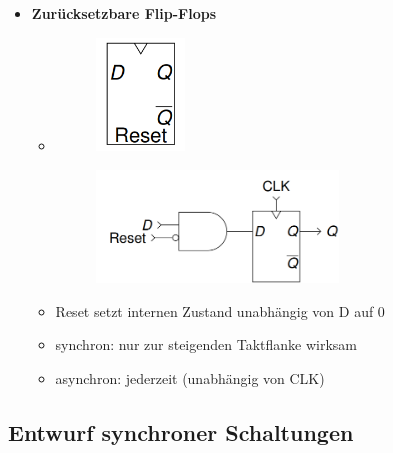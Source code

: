 \documentclass[11pt,a4paper]{article}
\begin{document}
\begin{itemize}
\item \textbf{Zurücksetzbare Flip-Flops}
	\begin{itemize}
	\item[]		
				\begin{minipage}{0.25\textwidth}
					\begin{figure}[H]
					\includegraphics[height=3cm]{reset1}
					\end{figure}
				\end{minipage}
				\begin{minipage}[t]{0.6\textwidth}
					\vspace{-2.25cm}
					\begin{figure}[H]
					\includegraphics[height=3cm]{reset2}
					\end{figure}
				\end{minipage}
	\end{itemize}
	\begin{itemize}
		\item Reset setzt internen Zustand unabhängig von D auf 0
		\item synchron: nur zur steigenden Taktflanke wirksam
		\item asynchron: jederzeit (unabhängig von CLK)
 	\end{itemize} 
 
\end{itemize}

 
\subsection{Entwurf synchroner Schaltungen}
\end{document}
